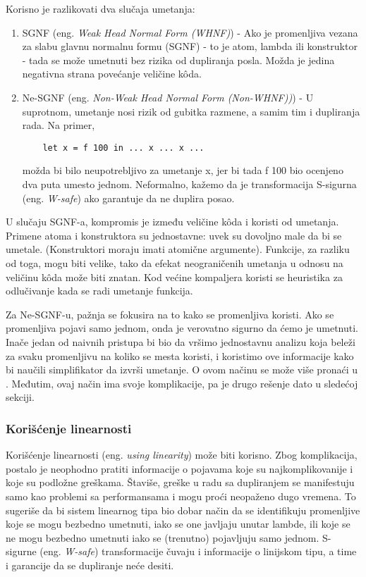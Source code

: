 Korisno je razlikovati dva slučaja umetanja:
\begin{enumerate}
	\item SGNF (eng. \emph{Weak Head Normal Form (WHNF)}) - Ako je promenljiva vezana za slabu glavnu normalnu formu (SGNF) - to 
	je atom, lambda ili konstruktor - tada se može umetnuti bez rizika od dupliranja posla. Možda je jedina negativna 
	strana povećanje veličine k\^{o}da.
	\item Ne-SGNF (eng. \emph{Non-Weak Head Normal Form (Non-WHNF))}) - U suprotnom, umetanje nosi rizik od gubitka razmene, a samim tim i dupliranja rada. Na primer,
	\begin{verbatim}
	let x = f 100 in ... x ... x ... 
	\end{verbatim}
	možda bi bilo neupotrebljivo za umetanje x, jer bi tada f 100 bio ocenjeno dva puta 
	umesto jednom. Neformalno, kažemo da je transformacija S-sigurna (eng. \emph{W-safe}) ako garantuje da ne duplira posao.
\end{enumerate}

U slučaju SGNF-a, kompromis je između veličine k\^{o}da i koristi od umetanja. Primene atoma i konstruktora su 
jednostavne: uvek su dovoljno male da bi se umetale. (Konstruktori moraju imati atomične argumente). Funkcije, za razliku od toga, mogu biti velike, tako da efekat neograničenih umetanja u odnosu na veličinu k\^{o}da može biti znatan. Kod većine kompaljera koristi se heuristika za odlučivanje kada se radi umetanje funkcija.

Za Ne-SGNF-u, pažnja se fokusira na to kako se promenljiva koristi. Ako se promenljiva 
pojavi samo jednom, onda je verovatno sigurno da ćemo je umetnuti. Inače jedan od naivnih pristupa bi bio da vršimo jednostavnu analizu koja 
beleži za svaku promenljivu na koliko se mesta koristi, i koristimo ove informacije kako bi naučili simplifikator da izvrši umetanje. O ovom načinu se može više pronaći u \cite{appel}. Međutim, ovaj način ima svoje komplikacije, pa je drugo rešenje dato u sledećoj sekciji.

\subsubsection{Korišćenje linearnosti}
\label{sec:podpodnaslovLinearity}

Korišćenje linearnosti (eng. \emph{using linearity}) može biti korisno. Zbog komplikacija, postalo je neophodno pratiti informacije o pojavama koje su najkomplikovanije i koje su podložne greškama. Štaviše, 
greške u radu sa dupliranjem se manifestuju samo kao problemi sa performansama i mogu proći neopaženo dugo vremena. To sugeriše da bi sistem linearnog tipa bio dobar način da se identifikuju promenljive koje se mogu bezbedno umetnuti, iako se one javljaju unutar lambde, ili koje se ne mogu bezbedno umetnuti iako se (trenutno) pojavljuju samo jednom. S-sigurne (eng. \emph{W-safe}) transformacije čuvaju i informacije o linijskom tipu, a time i garancije da se dupliranje neće desiti.

